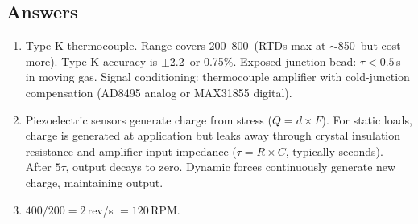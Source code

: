 \subsection{Answers}
\begin{enumerate}[leftmargin=1.5em]
\item Type K thermocouple. Range covers 200--800\,\degC{} (RTDs max at $\sim$850\,\degC{} but cost more). Type K accuracy is $\pm$2.2\,\degC{} or 0.75\%. Exposed-junction bead: $\tau < 0.5$\,s in moving gas. Signal conditioning: thermocouple amplifier with cold-junction compensation (AD8495 analog or MAX31855 digital).
\item Piezoelectric sensors generate charge from stress ($Q = d \times F$). For static loads, charge is generated at application but leaks away through crystal insulation resistance and amplifier input impedance ($\tau = R \times C$, typically seconds). After $5\tau$, output decays to zero. Dynamic forces continuously generate new charge, maintaining output.
\item $400 / 200 = 2$\,rev/s $= 120$\,RPM.
\end{enumerate}





